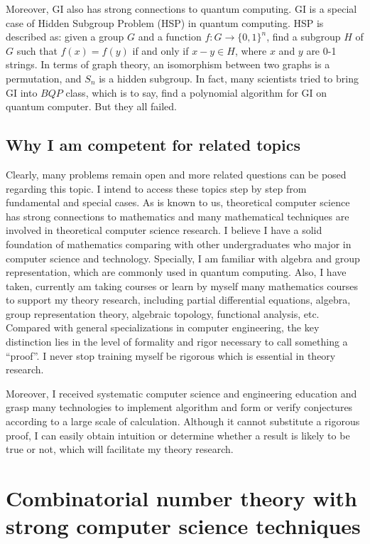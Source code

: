 \documentclass[12pt]{article}
\begin{document}
Moreover, GI also has strong connections to quantum computing. GI is a special case of Hidden Subgroup Problem (HSP) in quantum computing. HSP is described as: given a group $G$ and a function $f:G \to \{0,1\}^n$, find a subgroup $H$ of $G$ such that $f(x)=f(y)$ if and only if $x-y\in H$, where $x$ and $y$ are 0-1 strings. In terms of graph theory, an isomorphism between two graphs is a permutation, and $S_n$ is a hidden subgroup. In fact, many scientists tried to bring GI into $BQP$ class, which is to say, find a polynomial algorithm for GI on quantum computer. But they all failed. 
\subsection{Why I am competent for related topics}
Clearly, many problems remain open and more related questions can be posed regarding this topic. I intend to access these topics step by step from fundamental and special cases. As is known to us, theoretical computer science has strong connections to mathematics and many mathematical techniques are involved in theoretical computer science research. I believe I have a solid foundation of mathematics comparing with other undergraduates who major in computer science and technology. Specially, I am familiar with algebra and group representation, which are commonly used in quantum computing. Also, I have taken, currently am taking courses or learn by myself many mathematics courses to support my theory research, including partial differential equations, algebra, group representation theory, algebraic topology, functional analysis, etc. Compared with general specializations in computer engineering, the key distinction lies in the level of formality and rigor necessary to call something a “proof”. I never stop training myself be rigorous which is essential in theory research. 

Moreover, I received systematic computer science and engineering education and grasp many technologies to implement algorithm and form or verify conjectures according to a large scale of calculation. Although it cannot substitute a rigorous proof, I can easily obtain intuition or determine whether a result is likely to be true or not, which will facilitate my theory research. 

\bigskip 

\section{Combinatorial number theory with strong computer science techniques}
\end{document}
